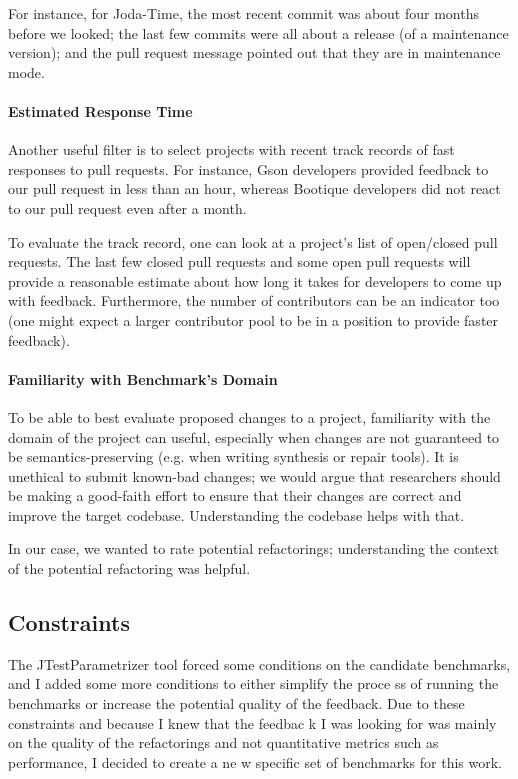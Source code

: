 For instance, for Joda-Time, the most recent commit was about four months before we looked; the last few commits were all about a release (of a maintenance version); and the pull request message pointed out that they are in maintenance mode.

\paragraph{Estimated Response Time}
Another useful filter is to select projects with recent track records of fast responses to pull requests. For instance, Gson developers provided feedback to our pull request in less than an hour, whereas Bootique developers did not react to our pull request even after a month.

To evaluate the track record, one can look at a project's list of open/closed pull requests. The last few closed pull requests and some open pull requests will provide a reasonable estimate about how long it takes for developers to come up with feedback. Furthermore, the number of contributors can be an indicator too (one might expect a larger contributor pool to be in a position to provide faster feedback).

\paragraph{Familiarity with Benchmark's Domain}
To be able to best evaluate proposed changes to a project, familiarity with the domain of the project can useful, especially when changes are not guaranteed to be semantics-preserving (e.g. when writing synthesis or repair tools). It is unethical to submit known-bad changes; we would argue that researchers should be making a good-faith effort to ensure that their changes are correct and improve the target codebase. Understanding the codebase helps with that.

In our case, we wanted to rate potential refactorings; understanding the context of the potential refactoring was helpful.


\subsection{Constraints}

The JTestParametrizer tool forced some conditions on the candidate benchmarks, and I added some more conditions to either simplify the proce
ss of running the benchmarks or increase the potential quality of the feedback. Due to these constraints and because I knew that the feedbac
k I was looking for was mainly on the quality of the refactorings and not quantitative metrics such as performance, I decided to create a ne
w specific set of benchmarks for this work.

